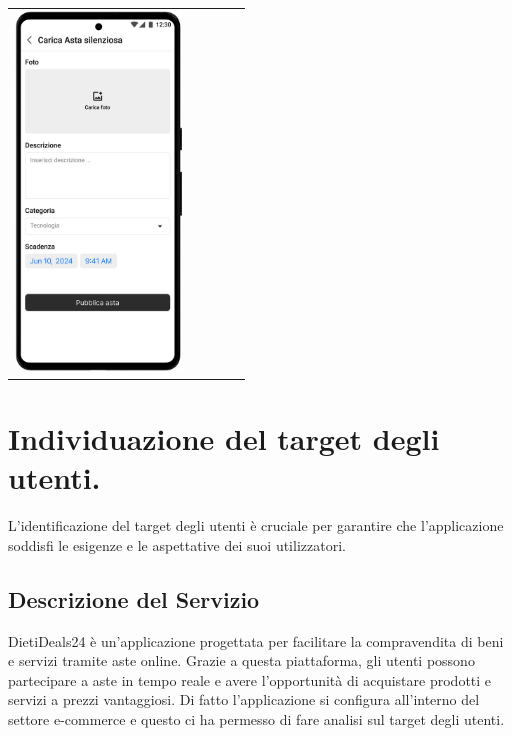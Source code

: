\begin{center}
\begin{tabular}{ccccc}
		\includegraphics[height=270pt]{assets/mockup/Carica Asta 1.1 Asta Silenziosa.png}       \\
	\end{tabular}
\end{center}





\newpage

\section{Individuazione del target degli utenti.}
L'identificazione del target degli utenti è cruciale per garantire che l'applicazione soddisfi le esigenze e le aspettative dei suoi utilizzatori.

\subsection*{Descrizione del Servizio}
DietiDeals24 è un'applicazione progettata per facilitare la compravendita di beni e servizi tramite aste online.
Grazie a questa piattaforma, gli utenti possono partecipare a aste in tempo reale e avere l'opportunità di acquistare prodotti e servizi a prezzi vantaggiosi.\sskip
Di fatto l'applicazione si configura all'interno del settore e-commerce e questo ci ha permesso di fare analisi sul target degli utenti.


